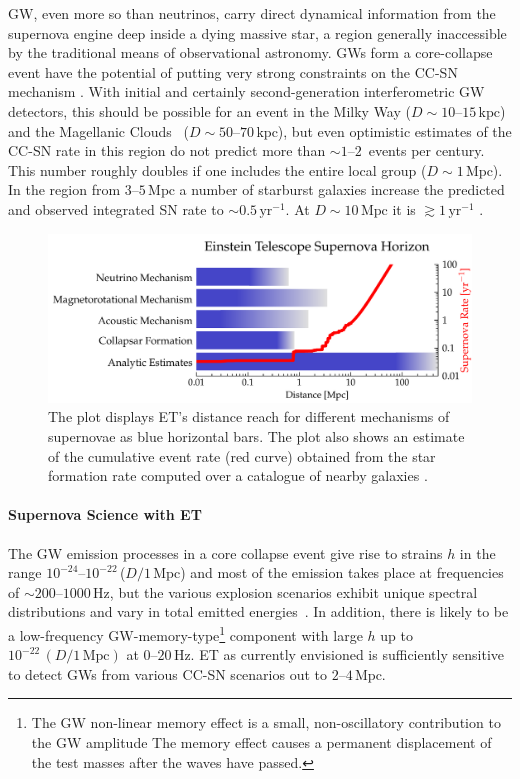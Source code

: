 GW, even more so than neutrinos, carry direct dynamical information
from the supernova engine deep inside a dying massive star, a region
generally inaccessible by the traditional means of observational
astronomy. GWs form a core-collapse event have the potential of
putting very strong constraints on the CC-SN mechanism
\cite{ott:09b,ott:09}.  With initial and certainly second-generation
interferometric GW detectors, this should be possible for an event in
the Milky Way ($D\sim 10$--$15\,\mathrm{kpc}$) and the Magellanic
Clouds~\cite{ott:09} ($D\sim 50$--$70\,\mathrm{kpc}$), but even
optimistic estimates of the CC-SN rate in this region do not predict
more than $\sim 1$--$2$~events per century. This number roughly doubles
if one includes the entire local group ($D\sim1\,\mathrm{Mpc}$). In
the region from $3$--$5\,\mathrm{Mpc}$ a number of starburst galaxies
increase the predicted and observed integrated SN rate to $\sim
0.5\,\mathrm{yr}^{-1}$. At $D\sim 10\,\mathrm{Mpc}$ it is
$\gtrsim 1\,\mathrm{yr}^{-1}$ \cite{ando:05}.
%
\begin{figure}
\centering
\includegraphics[width=0.85\columnwidth]{./Sec_ET_ScienceCase/ET_CCSN.pdf}
\caption{The plot displays ET's distance reach for different mechanisms
of supernovae as blue horizontal bars.  The plot also shows an estimate 
of the cumulative event rate (red curve) obtained
from the star formation rate computed over a catalogue of nearby galaxies
\cite{2005PhRvL..95f1103A}.\label{fig:supernova_rate}}
\end{figure}


\paragraph{Supernova Science with ET} 
The GW emission processes in a core collapse
event give rise to strains $h$ in the range $10^{-24}$--$10^{-22}$\,($D / 1\,
\mathrm{Mpc}$) and most of the emission takes place at frequencies of
$\sim 200$--$1000\,\mathrm{Hz}$, but the various explosion scenarios
exhibit unique spectral distributions and vary in total emitted
energies~\cite{ott:09,ott:09b}.  In addition, there is likely to be a
low-frequency GW-memory-type\footnote{The GW non-linear memory effect is a 
small, non-oscillatory contribution to the GW amplitude \cite{Blanchet:1992br,
Christodoulou:1991cr} The memory effect causes a permanent displacement 
of the test masses after the waves have passed.}
component with large $h$ up to
$10^{-22}\,(D / 1\,\mathrm{Mpc})$ at $0$--$20\,\mathrm{Hz}$.  ET as
currently envisioned is sufficiently sensitive to detect GWs
from various CC-SN scenarios out to $2$--$4\,\mathrm{Mpc}$. 

